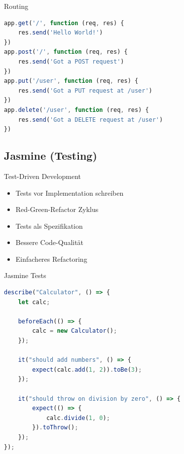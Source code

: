 \begin{KR}{Routing}
\begin{lstlisting}[language=JavaScript, style=basesmol]
app.get('/', function (req, res) {
    res.send('Hello World!')
})
app.post('/', function (req, res) {
    res.send('Got a POST request')
})
app.put('/user', function (req, res) {
    res.send('Got a PUT request at /user')
})
app.delete('/user', function (req, res) {
    res.send('Got a DELETE request at /user')
})
\end{lstlisting}
\end{KR}

\columnbreak

\subsection{Jasmine (Testing)}

\begin{concept}{Test-Driven Development}
    \begin{itemize}
        \item Tests vor Implementation schreiben
        \item Red-Green-Refactor Zyklus
        \item Tests als Spezifikation
        \item Bessere Code-Qualität
        \item Einfacheres Refactoring
    \end{itemize}
\end{concept}

\begin{KR}{Jasmine Tests}
\begin{lstlisting}[language=JavaScript, style=basesmol]
describe("Calculator", () => {
    let calc;
    
    beforeEach(() => {
        calc = new Calculator();
    });
    
    it("should add numbers", () => {
        expect(calc.add(1, 2)).toBe(3);
    });
    
    it("should throw on division by zero", () => {
        expect(() => {
            calc.divide(1, 0);
        }).toThrow();
    });
});
\end{lstlisting}
\end{KR}

